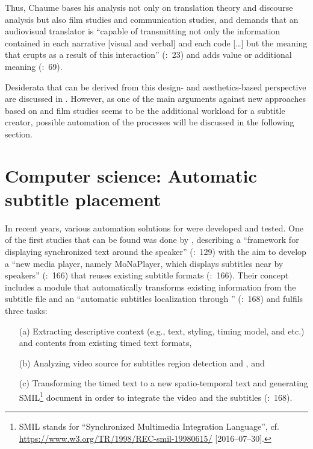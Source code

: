Thus, Chaume bases his analysis not only on translation theory and discourse analysis but also film studies and communication studies, and demands that an audiovisual translator is “capable of transmitting not only the information contained in each narrative [visual and verbal] and each code […] but the meaning that erupts as a result of this interaction” (\citealt{Chaume2004}:~23) and adds value \citep{Chion1993} or additional meaning (\citealt{Fowler1986}:~69).

Desiderata that can be derived from this design- and aesthetics-based perspective are discussed in . However, as one of the main arguments against new approaches based on  and film studies seems to be the additional workload for a subtitle creator, possible automation of the  processes will be discussed in the following section.

\section{Computer science: Automatic subtitle placement}\label{sec:3.4}

In recent years, various automation solutions for  were developed and tested. One of the first studies that can be found was done by \citet{park2008}, describing a “framework for displaying synchronized text around the speaker” (\citealt{mosconi2012}:~129) with the aim to develop a “new media player, namely MoNaPlayer, which displays subtitles near by speakers” (\citealt{park2008}:~166) that reuses existing subtitle formats (\citeyear{park2008}:~166). Their concept includes a module that automatically transforms existing information from the subtitle file and an “automatic subtitles localization through ” (\citeyear{park2008}:~168) and fulfils three tasks:

\begin{enumerate}
 \item[(a)]  Extracting descriptive context (e.g., text, styling, timing model, and etc.) and contents from existing timed text formats,
 \item[(b)]  Analyzing video source for subtitles region detection and , and
 \item[(c)]  Transforming the timed text to a new spatio-temporal text and generating SMIL\footnote{SMIL stands for “Synchronized Multimedia Integration Language”, cf. \url{https://www.w3.org/TR/1998/REC-smil-19980615/} [2016--07--30].} document in order to integrate the video and the subtitles (\citeyear{park2008}:~168).
\end{enumerate} 

